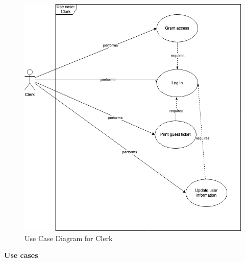 \begin{figure}[H]
    \centering
    \includegraphics[height=0.5\textwidth]{Images/UseCaseDiagrams/Clerk.png}
    \caption{Use Case Diagram for Clerk}
\end{figure}

\textbf{Use cases}

